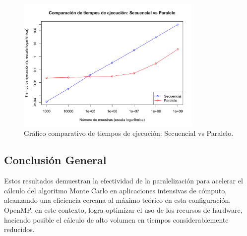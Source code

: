 \documentclass[a4paper, 10pt, onecolumn]{IEEEtran}
\begin{document}
\begin{figure}[H]
  \centering
  \includegraphics[width=0.8\textwidth]{./img/efficiency.png}
  \caption{Gráfico comparativo de tiempos de ejecución: Secuencial vs Paralelo.}
  \label{fig:efficiency}
\end{figure}

\subsection{Conclusión General}

Estos resultados demuestran la efectividad de la paralelización para acelerar el cálculo del algoritmo Monte Carlo en aplicaciones intensivas de cómputo, alcanzando una eficiencia cercana al máximo teórico en esta configuración. OpenMP, en este contexto, logra optimizar el uso de los recursos de hardware, haciendo posible el cálculo de alto volumen en tiempos considerablemente reducidos.
\end{document}
